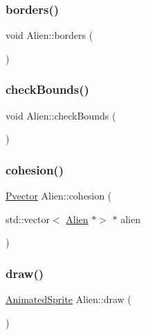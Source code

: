 \subsubsection{\texorpdfstring{borders()}{borders()}}
{\footnotesize\ttfamily void Alien\+::borders (\begin{DoxyParamCaption}{ }\end{DoxyParamCaption})}

\mbox{\label{class_alien_a1f94914265a34170958fbf0cc4dbf187}} 
\subsubsection{\texorpdfstring{check\+Bounds()}{checkBounds()}}
{\footnotesize\ttfamily void Alien\+::check\+Bounds (\begin{DoxyParamCaption}{ }\end{DoxyParamCaption})}

\mbox{\label{class_alien_aa4d875c73cb6899cb9854bca83443ce4}} 
\subsubsection{\texorpdfstring{cohesion()}{cohesion()}}
{\footnotesize\ttfamily \hyperlink{class_pvector}{Pvector} Alien\+::cohesion (\begin{DoxyParamCaption}\item[{std\+::vector$<$ \hyperlink{class_alien}{Alien} $\ast$$>$ $\ast$}]{alien }\end{DoxyParamCaption})}

\mbox{\label{class_alien_a518e51803e638c46d0452ba283f2aad6}} 
\subsubsection{\texorpdfstring{draw()}{draw()}}
{\footnotesize\ttfamily \hyperlink{class_animated_sprite}{Animated\+Sprite} Alien\+::draw (\begin{DoxyParamCaption}{ }\end{DoxyParamCaption})}

\mbox{\label{class_alien_a087d886ecd8b70d2554bb54fae81528d}} 
